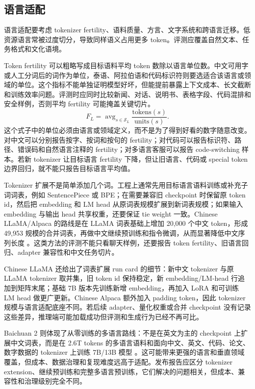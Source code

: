 \documentclass[UTF8,zihao=-4,openany]{ctexbook}
\begin{document}
\subsection{语言适配}
语言适配要考虑 tokenizer fertility、语料质量、方言、文字系统和跨语言迁移。低资源语言常被过度切分，导致同样语义占用更多 token。评测应覆盖自然文本、任务格式和文化语境。

Token fertility 可以粗略写成目标语料平均 token 数除以语言单位数。中文可用字或人工分词后的词作为单位，泰语、阿拉伯语和代码标识符则要选适合该语言或领域的单位。这个指标不能单独证明模型好坏，但能提前暴露上下文成本、长文截断和训练效率问题。评测时应同时比较新闻、对话、说明书、表格字段、代码混排和安全样例，否则平均 fertility 可能掩盖关键切片。
\[
  F_L=\operatorname{avg}_{s\in \mathcal{S}_L}
  \frac{\mathrm{tokens}(s)}{\mathrm{units}(s)} .
\]
这个式子中的单位必须由语言或领域定义，而不是为了得到好看的数字随意改变。对中文可以分别报告按字、按词和按句的 fertility；对代码可以报告标识符、路径、错误码和自然语言注释的 fertility；对多语言客服可以报告 code-switching 样本。若新 tokenizer 让目标语言 fertility 下降，但让旧语言、代码或 special token 边界回归，就不能只报告目标语言平均值。

Tokenizer 扩展不是简单添加几个词。工程上通常先用目标语言语料训练或补充子词词表，例如 SentencePiece 或 BPE；在需要兼容旧 checkpoint 时保留原 token id，然后把 embedding 和 LM head 从原词表规模扩展到新词表规模；如果输入 embedding 与输出 head 共享权重，还要保证 tie weight 一致。Chinese LLaMA/Alpaca 的路线是在 LLaMA 词表基础上增加 20,000 个中文 token，形成 49,953 规模的合并词表，再做中文继续预训练和指令微调，从而显著降低中文序列长度 \cite{cui2023efficient}。这类方法的评测不能只看聊天样例，还要报告 token fertility、旧语言回归、adapter 兼容性和中文任务切片。

Chinese LLaMA 还给出了词表扩展 run card 的细节：新中文 tokenizer 与原 LLaMA tokenizer 取并集，旧 token id 保持稳定，新 embedding/LM-head 行追加到矩阵末尾；基础 7B 版本先训练新增 embedding，再加入 LoRA 和可训练 LM head 做更广更新。Chinese Alpaca 额外加入 padding token，因此 tokenizer 规模与语言适配底座不同。若后续 adapter、量化权重或合并 checkpoint 没有记录这些差异，推理端可能加载成功但评测和生成行为已经不再可比。

Baichuan 2 则体现了从零训练的多语言路线：不是在英文为主的 checkpoint 上扩展中文词表，而是在 2.6T tokens 的多语言语料和面向中文、英文、代码、论文、数字数据的 tokenizer 上训练 7B/13B 模型 \cite{yang2023baichuan2}。这可能带来更强的语言和垂直领域覆盖，但成本、数据治理和复现难度远高于适配。发布报告应区分 tokenizer extension、继续预训练和完整多语言预训练，它们解决的问题相关，但成本、兼容性和治理级别完全不同。
\end{document}

